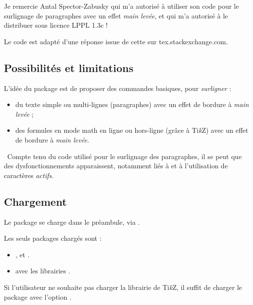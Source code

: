\documentclass[french,11pt,a4paper]{article}
\providecommand\tikzlogo{Ti\textit{k}Z}
\let\TikZ\tikzlogo
\begin{document}
Je remercie Antal Spector-Zabusky qui m'a autorisé à utiliser son code pour le surlignage de paragraphes avec un effet \textit{main levée}, et qui m'a autorisé à le distribuer sous licence \textsf{LPPL 1.3c} !

Le code est adapté d'une réponse issue de cette  \href{https://tex.stackexchange.com/questions/5959/cool-text-highlighting-in-latex}{} sur \textsf{tex.stackexchange.com}.

\pagebreak

\subsection{Possibilités et limitations}

L'idée du package  est de proposer des commandes basiques, pour \textit{surligner} :

\begin{itemize}
	\item du texte simple ou multi-lignes (paragraphes) avec un effet de bordure à \textit{main levée} ;
	\item des formules en mode math en ligne ou hors-ligne (grâce à \TikZ) avec un effet de bordure à \textit{main levée}.
\end{itemize}

{\small\faBomb}~Compte tenu du code utilisé pour le surlignage des paragraphes, il se peut que des dysfonctionnements apparaissent, notamment liés à  et à l'utilisation de caractères \textit{actifs}.

\subsection{Chargement}

Le package se charge dans le préambule, via .

Les seuls packages chargés sont :

\begin{itemize}
	\item {},  et .
	\item {} avec les librairies .
\end{itemize}

Si l'utilisateur ne souhaite pas charger la librairie  de \TikZ, il suffit de charger le package avec l'option \MontreCode{[nobabel]}.
\end{document}
